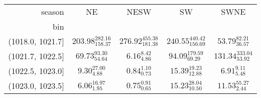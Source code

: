 \begin{tabular}{@{\extracolsep\fill}rcccc}
\toprule
season &                          NE &                        NESW &                          SW &                       SWNE \\
bin              &                             &                             &                             &                            \\
\midrule
(1018.0, 1021.7] &  $203.98_{158.37}^{282.16}$ &  $276.92_{181.38}^{455.38}$ &  $240.55_{156.69}^{440.42}$ &    $53.79_{36.57}^{82.21}$ \\
(1021.7, 1022.5] &     $69.73_{54.64}^{93.30}$ &        $6.16_{4.86}^{8.42}$ &    $94.09_{69.29}^{179.59}$ &  $131.34_{53.92}^{333.04}$ \\
(1022.5, 1023.0] &       $9.30_{4.88}^{27.00}$ &        $0.84_{0.73}^{1.10}$ &     $15.39_{12.88}^{19.23}$ &       $6.91_{5.48}^{9.11}$ \\
(1023.0, 1023.5] &       $6.06_{1.95}^{16.97}$ &        $0.75_{0.65}^{0.91}$ &     $15.23_{10.50}^{28.04}$ &     $11.53_{2.44}^{55.27}$ \\
\bottomrule
\end{tabular}
